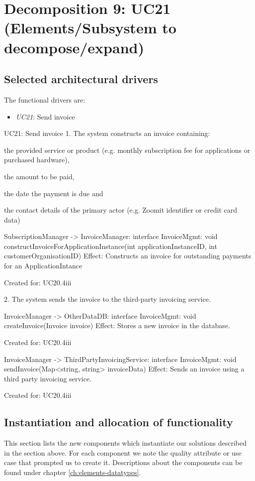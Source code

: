 \section{Decomposition 9: UC21 (Elements/Subsystem to decompose/expand)}


\subsection{Selected architectural drivers}
    The functional drivers are:
    \begin{itemize}
        \item \emph{UC21}: Send invoice
    \end{itemize}

    UC21: Send invoice
        1. The system constructs an invoice containing:
            { the provided service or product (e.g. monthly subscription fee for applications or purchased hardware),
            { the amount to be paid,
            { the date the payment is due and
            { the contact details of the primary actor (e.g. Zoomit identifier or credit card data)

                SubscriptionManager -> InvoiceManager: interface InvoiceMgmt: void constructInvoiceForApplicationInstance(int applicationInstanceID, int customerOrganisationID)
                    Effect: Constructs an invoice for outstanding payments for an ApplicationIntance
                    \item Created for: UC20.4iii

        2. The system sends the invoice to the third-party invoicing service.

            InvoiceManager -> OtherDataDB: interface InvoiceMgmt: void createInvoice(Invoice invoice)
                    Effect: Stores a new invoice in the database.
                    \item Created for: UC20.4iii

            InvoiceManager -> ThirdPartyInvoicingService: interface InvoiceMgmt: void sendInvoice(Map<string, string> invoiceData)
                    Effect: Sends an invoice using a third party invoicing service.
                    \item Created for: UC20.4iii
               


\subsection{Instantiation and allocation of functionality}
    This section lists the new components which instantiate our solutions
    described in the section above. For each component we note the quality
    attribute or use case that prompted us to create it. Descriptions about
    the components can be found under chapter \ref{ch:elements-datatypes}. \\

}}}}
